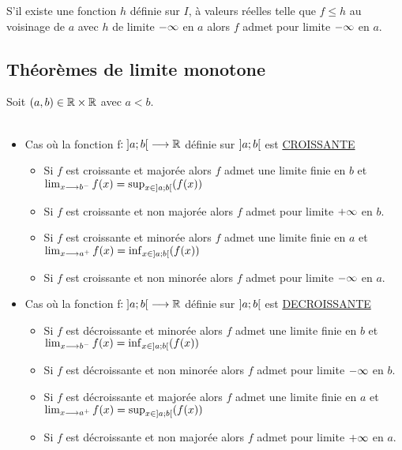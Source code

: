 \begin{theo} 
S’il existe une fonction \(h\) définie sur \(I\), à valeurs réelles telle que \(f \leq h\) au voisinage de \(a\) avec \(h\) de limite \(-\infty\) en \(a\) alors \(f\) admet pour limite \(-\infty\) en \(a\).
\end{theo}

\subsection{Théorèmes de limite monotone}
\begin{theo}
    Soit \((a, b) \in \mathbb{R} \times \mathbb{R}\) avec \(a < b\).\\~\\
    \begin{itemize}
        \item Cas où la fonction f\( : \left]a;b\right[ \longrightarrow \mathbb{R}\) définie sur \(\left]a;b\right[\) est \underline{CROISSANTE}\\
        \begin{itemize}
            \item Si \(f\) est croissante et majorée alors \(f\) admet une limite finie en \(b\) et \( \lim_{x \longrightarrow b^-} f(x) = \sup_{x \in \left]a;b\right[} (f(x))\)
            \item Si \(f\) est croissante et non majorée alors \(f\) admet pour limite \(+\infty \) en \(b\).\\
            \item Si \(f\) est croissante et minorée alors \(f\) admet une limite finie en \(a\) et \( \lim_{x \longrightarrow a^+} f(x) = \inf_{x \in \left]a;b\right[} (f(x))\)
            \item Si \(f\) est croissante et non minorée alors \(f\) admet pour limite \(-\infty\) en \(a\).
        \end{itemize}
        \item Cas où la fonction f\( : \left]a;b\right[ \longrightarrow \mathbb{R}\) définie sur \(\left]a;b\right[\) est \underline{DECROISSANTE}\\
        \begin{itemize}
            \item Si \(f\) est décroissante et minorée alors \(f\) admet une limite finie en \(b\) et \( \lim_{x \longrightarrow b^-} f(x) = \inf_{x \in \left]a;b\right[} (f(x))\)
            \item Si \(f\) est décroissante et non minorée alors \(f\) admet pour limite \(-\infty \) en \(b\).\\
            \item Si \(f\) est décroissante et majorée alors \(f\) admet une limite finie en \(a\) et \( \lim_{x \longrightarrow a^+} f(x) = \sup_{x \in \left]a;b\right[} (f(x))\)
            \item Si \(f\) est décroissante et non majorée alors \(f\) admet pour limite \(+\infty\) en \(a\).
        \end{itemize}
\end{itemize}
\end{theo}

